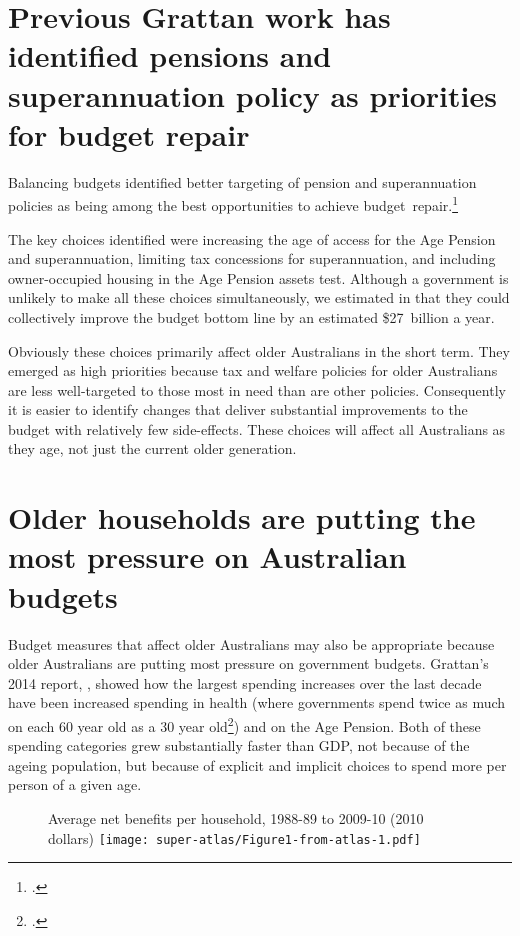 \section{Previous Grattan work has identified pensions and superannuation policy as priorities for budget repair}\label{sec:SUPER-prev-grattan-work-identified-super}
Balancing budgets identified better targeting of pension and superannuation policies as being among the best opportunities to achieve budget~repair.\footcite[][29]{DaleyMcGannonSavage2013BudgetPressures}

The key choices identified were increasing the age of access for the Age Pension and superannuation, limiting tax concessions for superannuation, and including owner-occupied housing in the Age Pension assets test. Although a government is unlikely to make all these choices simultaneously, we estimated in  that they could collectively improve the budget bottom line by an estimated \$27~billion a year. 

Obviously these choices primarily affect older Australians in the short term. They emerged as high priorities because tax and welfare policies for older Australians are less well-targeted to those most in need than are other policies. Consequently it is easier to identify changes that deliver substantial improvements to the budget with relatively few side-effects. These choices will affect all Australians as they age, not just the current older generation. 

\section{Older households are putting the most pressure on Australian budgets}
Budget measures that affect older Australians may also be appropriate because older Australians are putting most pressure on government budgets. Grattan’s 2014 report, , showed how the largest spending increases over the last decade have been increased spending in health (where governments spend twice as much on each 60 year old as a 30 year old\footcite[][25]{DaleyMcGannonHunter2014}) and on the Age Pension. Both of these spending categories grew substantially faster than GDP, not because of the ageing population, but because of explicit and implicit choices to spend more per person of a given age.

\begin{figure}[htp]
%
{Average net benefits per household, 1988-89 to 2009-10 (2010 dollars)}\label{fig:SUPER-Wealth-of-generations-chart}
\texttt{[image: super-atlas/Figure1-from-atlas-1.pdf]}

\end{figure}

